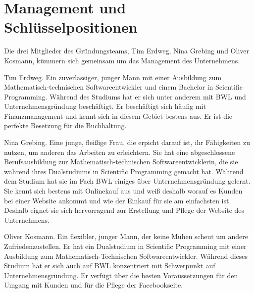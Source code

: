 \chapter{Management und Schlüsselpositionen}
\label{cha:7}
Die drei Mitglieder des Gründungsteams, Tim Erdweg, Nina Grebing und Oliver Kosmann, kümmern sich gemeinsam um das Management des Unternehmens. 

Tim Erdweg. Ein zuverlässiger, junger Mann mit einer Ausbildung zum Mathematisch-technischen Softwareentwickler und einem Bachelor in Scientific Programming. Während des Studiums hat er sich unter anderem mit BWL und Unternehmensgründung beschäftigt. Er beschäftigt sich häufig mit Finanzmanagement und kennt sich in diesem Gebiet bestens aus. Er ist die perfekte Besetzung für die Buchhaltung.

Nina Grebing. Eine junge, fleißige Frau, die erpicht darauf ist, ihr Fähigkeiten zu nutzen, um anderen das Arbeiten zu erleichtern. Sie hat eine abgeschlossene Berufsausbildung zur Mathematisch-technischen Softwareentwicklerin, die sie während ihres Dualstudiums in Scientific Programming gemacht hat. Während dem Studium hat sie im Fach BWL einiges über Unternehmensgründung gelernt. Sie kennt sich bestens mit Onlinekauf aus und weiß deshalb worauf es Kunden bei einer Website ankommt und wie der Einkauf für sie am einfachsten ist. Deshalb eignet sie sich hervorragend zur Erstellung und Pflege der Website des Unternehmens.

Oliver Kosmann. Ein flexibler, junger Mann, der keine Mühen scheut um andere Zufriedenzustellen. Er hat ein Dualstudium in Scientific Programming mit einer Ausbildung zum Mathematisch-Technischen Softwareentwickler. Während dieses Studium hat er sich auch auf BWL konzentriert mit Schwerpunkt auf Unternehmensgründung. Er verfügt über die besten Voraussetzungen für den Umgang mit Kunden und für die Pflege der Facebookseite.\\
 